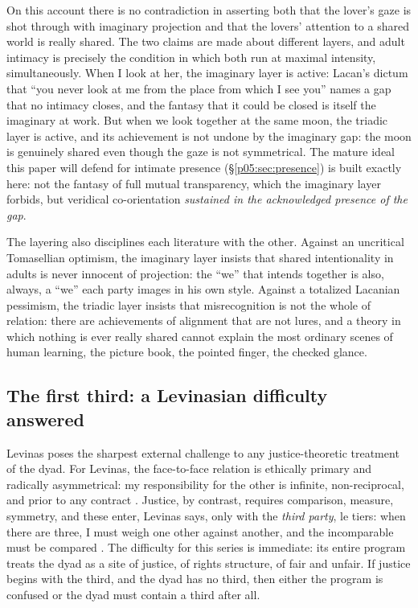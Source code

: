 \documentclass[11pt,a4paper]{article}
\theoremstyle{seriesthm}
\begin{document}
On this account there is no contradiction in asserting both that the lover's gaze is shot through with imaginary projection and that the lovers' attention to a shared world is really shared. The two claims are made about different layers, and adult intimacy is precisely the condition in which both run at maximal intensity, simultaneously. When I look at her, the imaginary layer is active: Lacan's dictum that ``you never look at me from the place from which I see you'' \parencite{lacan1977xi} names a gap that no intimacy closes, and the fantasy that it could be closed is itself the imaginary at work. But when we look together at the same moon, the triadic layer is active, and its achievement is not undone by the imaginary gap: the moon is genuinely shared even though the gaze is not symmetrical. The mature ideal this paper will defend for intimate presence (§\ref{p05:sec:presence}) is built exactly here: not the fantasy of full mutual transparency, which the imaginary layer forbids, but veridical co-orientation \emph{sustained in the acknowledged presence of the gap}.

The layering also disciplines each literature with the other. Against an uncritical Tomasellian optimism, the imaginary layer insists that shared intentionality in adults is never innocent of projection: the ``we'' that intends together is also, always, a ``we'' each party images in his own style. Against a totalized Lacanian pessimism, the triadic layer insists that misrecognition is not the whole of relation: there are achievements of alignment that are not lures, and a theory in which nothing is ever really shared cannot explain the most ordinary scenes of human learning, the picture book, the pointed finger, the checked glance.

\subsection{The first third: a Levinasian difficulty answered}
\label{p05:sec:third}

Levinas poses the sharpest external challenge to any justice-theoretic treatment of the dyad. For Levinas, the face-to-face relation is ethically primary and radically asymmetrical: my responsibility for the other is infinite, non-reciprocal, and prior to any contract \parencite{levinas1969}. Justice, by contrast, requires comparison, measure, symmetry, and these enter, Levinas says, only with the \emph{third party}, le tiers: when there are three, I must weigh one other against another, and the incomparable must be compared \parencite{levinas1998}. The difficulty for this series is immediate: its entire program treats the dyad as a site of justice, of rights structure, of fair and unfair. If justice begins with the third, and the dyad has no third, then either the program is confused or the dyad must contain a third after all.
\end{document}

